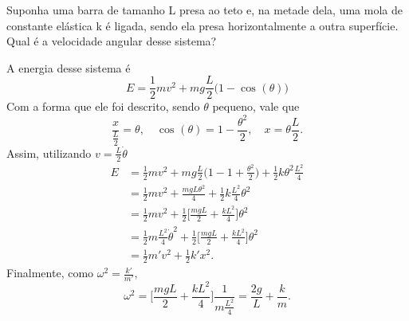 \documentclass[PhysicsII/phsyicsII_notes.tex]{subfiles}
\begin{document}
\begin{example}
	Suponha uma barra de tamanho L presa ao teto e, na metade dela, uma mola de constante elástica k é ligada, sendo ela presa horizontalmente a outra superfície.
	Qual é a velocidade angular desse sistema?

	A energia desse sistema é
	\[
		E = \frac{1}{2}mv^{2} + mg \frac{L}{2}\biggl(1-\cos^{}{(\theta )}\biggr)
	\]
	Com a forma que ele foi descrito, sendo \(\theta \) pequeno, vale que
	\[
		\frac{x}{\frac{L}{2}} = \theta,\quad \cos^{}{(\theta )} = 1 -\frac{\theta^{2}}{2},\quad x = \theta \frac{L}{2}.
	\]
	Assim, utilizando \(v = \frac{L}{2}\dot\theta \)
	\begin{align*}
		E & = \frac{1}{2}mv^{2} + mg \frac{L}{2}\biggl(1 - 1 + \frac{\theta ^{2}}{2}\biggr) + \frac{1}{2}k\theta^{2}\frac{L^{2}}{4} \\
		  & = \frac{1}{2}mv^{2} + \frac{mgL\theta ^{2}}{4} + \frac{1}{2}k \frac{L^{2}}{4}\theta^{2}                                 \\
		  & = \frac{1}{2}mv^{2} + \frac{1}{2}\biggl[\frac{mgL}{2} + \frac{kL^{2}}{4}\biggr]\theta^{2}                               \\
		  & = \frac{1}{2}m \frac{L^{2}}{4}\dot \theta ^{2} + \frac{1}{2}\biggl[\frac{mgL}{2}+ \frac{kL^{2}}{4}\biggr]\theta^{2}     \\
		  & = \frac{1}{2}m'v^{2} + \frac{1}{2}k'x^{2}.
	\end{align*}
	Finalmente, como \(\omega^{2} = \frac{k'}{m'}\),
	\[
		\omega^{2} = \biggl[\frac{mgL}{2}+ \frac{kL^{2}}{4}\biggr]\frac{1}{m \frac{L^{2}}{4}} = \frac{2g}{L} + \frac{k}{m}.
	\]
\end{example}
\end{document}
